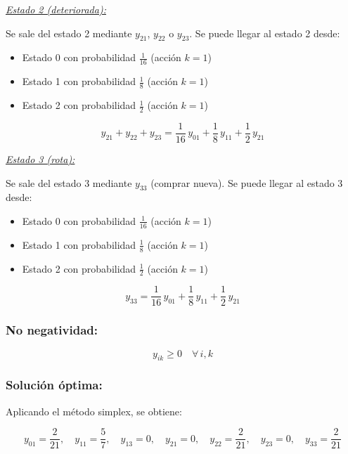 \documentclass[a4paper,11pt]{article}
\begin{document}
\vspace{0.5em}

\textit{\underline{Estado 2 (deteriorada):}}

\vspace{0.5em}

Se sale del estado 2 mediante $y_{21}$, $y_{22}$ o $y_{23}$. Se puede llegar al estado 2 desde:
\begin{itemize}
    \item Estado 0 con probabilidad $\frac{1}{16}$ (acción $k=1$)
    \item Estado 1 con probabilidad $\frac{1}{8}$ (acción $k=1$)
    \item Estado 2 con probabilidad $\frac{1}{2}$ (acción $k=1$)
\end{itemize}

\[
y_{21} + y_{22} + y_{23} = \frac{1}{16}\,y_{01} + \frac{1}{8}\,y_{11} + \frac{1}{2}\,y_{21}
\]

\vspace{0.5em}

\textit{\underline{Estado 3 (rota):}}

\vspace{0.5em}

Se sale del estado 3 mediante $y_{33}$ (comprar nueva). Se puede llegar al estado 3 desde:
\begin{itemize}
    \item Estado 0 con probabilidad $\frac{1}{16}$ (acción $k=1$)
    \item Estado 1 con probabilidad $\frac{1}{8}$ (acción $k=1$)
    \item Estado 2 con probabilidad $\frac{1}{2}$ (acción $k=1$)
\end{itemize}

\[
y_{33} = \frac{1}{16}\,y_{01} + \frac{1}{8}\,y_{11} + \frac{1}{2}\,y_{21}
\]

\subsubsection{No negatividad:}

\[
y_{ik} \geq 0 \quad \forall\, i, k
\]

\subsubsection{Solución óptima:}

Aplicando el método simplex, se obtiene:

\[
y_{01} = \frac{2}{21}, \quad y_{11} = \frac{5}{7}, \quad y_{13} = 0, \quad y_{21} = 0, \quad y_{22} = \frac{2}{21}, \quad y_{23} = 0, \quad y_{33} = \frac{2}{21}
\]
\end{document}
